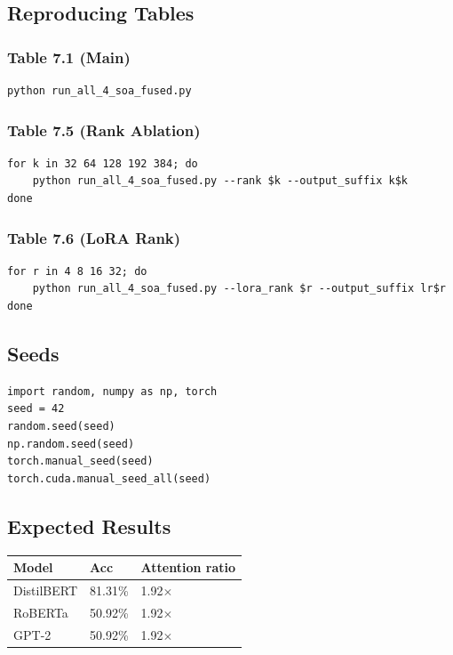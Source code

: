 \subsection{Reproducing Tables}

\subsubsection{Table 7.1 (Main)}
\begin{lstlisting}
python run_all_4_soa_fused.py
\end{lstlisting}

\subsubsection{Table 7.5 (Rank Ablation)}
\begin{lstlisting}
for k in 32 64 128 192 384; do
    python run_all_4_soa_fused.py --rank $k --output_suffix k$k
done
\end{lstlisting}

\subsubsection{Table 7.6 (LoRA Rank)}
\begin{lstlisting}
for r in 4 8 16 32; do
    python run_all_4_soa_fused.py --lora_rank $r --output_suffix lr$r
done
\end{lstlisting}

\subsection{Seeds}

\begin{lstlisting}
import random, numpy as np, torch
seed = 42
random.seed(seed)
np.random.seed(seed)
torch.manual_seed(seed)
torch.cuda.manual_seed_all(seed)
\end{lstlisting}

\subsection{Expected Results}

\begin{table}[H]
\centering
\small
\begin{tabular}{lll}
\toprule
\textbf{Model} & \textbf{Acc} & \textbf{Attention ratio} \\
\midrule
DistilBERT & 81.31\% & 1.92$\times$ \\
RoBERTa & 50.92\% & 1.92$\times$ \\
GPT-2 & 50.92\% & 1.92$\times$ \\
\bottomrule
\end{tabular}
\end{table}

